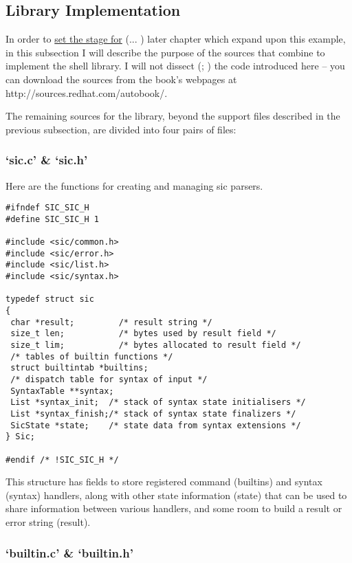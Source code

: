\subsection{Library Implementation}


In order to \underline{set the stage for} ({\MbQ{}}... {\MaQ{}}) later chapter which 
expand upon this example, in this subsection I will describe the purpose of 
the sources that combine to implement the shell library. I will not 
dissect ({\MdQ{}}; {\McQ{}}) the code introduced here -- you can download the 
sources from the book's webpages at http://sources.redhat.com/autobook/. 


The remaining sources for the library, beyond the support files described in the previous subsection, are divided into four pairs of files: 

\subsubsection{`sic.c' \& `sic.h'}

Here are the functions for creating and managing sic parsers. 

\begin{Verbatim}[frame=single]
#ifndef SIC_SIC_H
#define SIC_SIC_H 1

#include <sic/common.h>
#include <sic/error.h>
#include <sic/list.h>
#include <sic/syntax.h>

typedef struct sic 
{
 char *result;         /* result string */
 size_t len;           /* bytes used by result field */
 size_t lim;           /* bytes allocated to result field */
 /* tables of builtin functions */
 struct builtintab *builtins;
 /* dispatch table for syntax of input */
 SyntaxTable **syntax;
 List *syntax_init;  /* stack of syntax state initialisers */
 List *syntax_finish;/* stack of syntax state finalizers */
 SicState *state;    /* state data from syntax extensions */
} Sic;

#endif /* !SIC_SIC_H */
\end{Verbatim}

This structure has fields to store registered command (builtins) and 
syntax (syntax) handlers, along with other state information (state) that can 
be used to share information between various handlers, and some room to build 
a result or error string (result). 

\subsubsection{`builtin.c' \& `builtin.h'}

